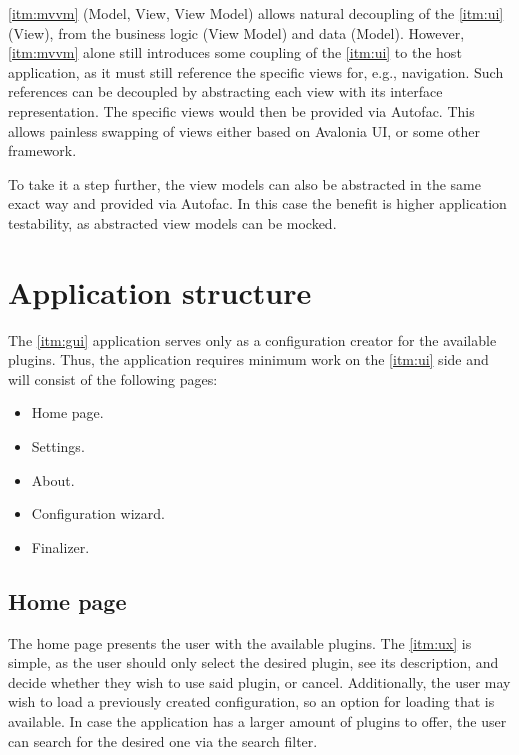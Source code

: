 \ref{itm:mvvm} (Model, View, View Model) allows natural decoupling of the \ref{itm:ui} (View), from the business logic (View Model) and data (Model). However, \ref{itm:mvvm} alone still introduces some coupling of the \ref{itm:ui} to the host application, as it must still reference the specific views for, e.g., navigation. Such references can be decoupled by abstracting each view with its interface representation. The specific views would then be provided via Autofac. This allows painless swapping of views either based on Avalonia UI, or some other framework.

To take it a step further, the view models can also be abstracted in the same exact way and provided via Autofac. In this case the benefit is higher application testability, as abstracted view models can be mocked.

\section{Application structure}

The \ref{itm:gui} application serves only as a configuration creator for the available plugins. Thus, the application requires minimum work on the \ref{itm:ui} side and will consist of the following pages:
\begin{itemize}
    \item Home page.
    \item Settings.
    \item About.
    \item Configuration wizard.
    \item Finalizer.
\end{itemize}

\subsection{Home page}

The home page presents the user with the available plugins. The \ref{itm:ux} is simple, as the user should only select the desired plugin, see its description, and decide whether they wish to use said plugin, or cancel.
Additionally, the user may wish to load a previously created configuration, so an option for loading that is available.
In case the application has a larger amount of plugins to offer, the user can search for the desired one via the search filter.

